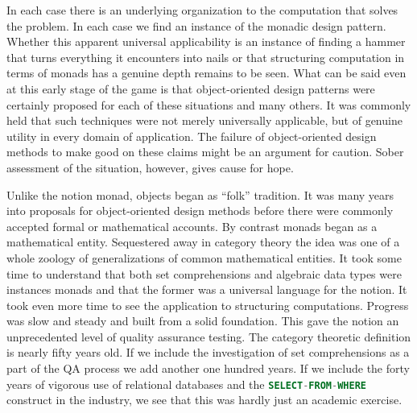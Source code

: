 In each case there is an underlying organization to the computation
that solves the problem. In each case we find an instance of the
monadic design pattern. Whether this apparent universal applicability
is an instance of finding a hammer that turns everything it encounters
into nails or that structuring computation in terms of monads has a
genuine depth remains to be seen. What can be said even at this early
stage of the game is that object-oriented design patterns were
certainly proposed for each of these situations and many others. It
was commonly held that such techniques were not merely universally
applicable, but of genuine utility in every domain of application. The
failure of object-oriented design methods to make good on these claims
might be an argument for caution. Sober assessment of the situation,
however, gives cause for hope.

Unlike the notion monad, objects began as ``folk'' tradition. It was
many years into proposals for object-oriented design methods before
there were commonly accepted formal or mathematical accounts. By
contrast monads began as a mathematical entity. Sequestered away in
category theory the idea was one of a whole zoology of generalizations
of common mathematical entities. It took some time to understand that
both set comprehensions and algebraic data types were instances monads
and that the former was a universal language for the notion. It took
even more time to see the application to structuring
computations. Progress was slow and steady and built from a solid
foundation. This gave the notion an unprecedented level of quality
assurance testing. The category theoretic definition is nearly fifty
years old. If we include the investigation of set comprehensions as a
part of the QA process we add another one hundred years. If we include
the forty years of vigorous use of relational databases and the
\lstinline[language=SQL]!SELECT-FROM-WHERE! construct in the industry,
we see that this was hardly just an academic exercise.

